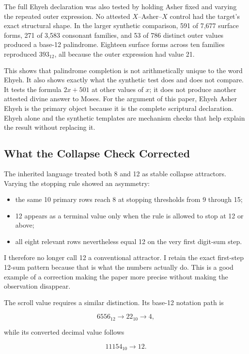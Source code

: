 The full Ehyeh declaration was also tested by holding Asher fixed and varying the repeated outer expression. No attested $X$--Asher--$X$ control had the target's exact structural shape. In the larger synthetic comparison, 591 of 7,677 surface forms, 271 of 3,583 consonant families, and 53 of 786 distinct outer values produced a base-12 palindrome. Eighteen surface forms across ten families reproduced $393_{12}$, all because the outer expression had value 21.

This shows that palindrome completion is not arithmetically unique to the word Ehyeh. It also shows exactly what the synthetic test does and does not compare. It tests the formula $2x+501$ at other values of $x$; it does not produce another attested divine answer to Moses. For the argument of this paper, Ehyeh Asher Ehyeh is the primary object because it is the complete scriptural declaration. Ehyeh alone and the synthetic templates are mechanism checks that help explain the result without replacing it.

\subsection{What the Collapse Check Corrected}

The inherited language treated both 8 and 12 as stable collapse attractors. Varying the stopping rule showed an asymmetry:

\begin{itemize}
\item the same 10 primary rows reach 8 at stopping thresholds from 9 through 15;
\item 12 appears as a terminal value only when the rule is allowed to stop at 12 or above;
\item all eight relevant rows nevertheless equal 12 on the very first digit-sum step.
\end{itemize}

I therefore no longer call 12 a conventional attractor. I retain the exact first-step 12-sum pattern because that is what the numbers actually do. This is a good example of a correction making the paper more precise without making the observation disappear.

The scroll value requires a similar distinction. Its base-12 notation path is

\[
6556_{12}\rightarrow22_{10}\rightarrow4,
\]

while its converted decimal value follows

\[
11154_{10}\rightarrow12.
\]


